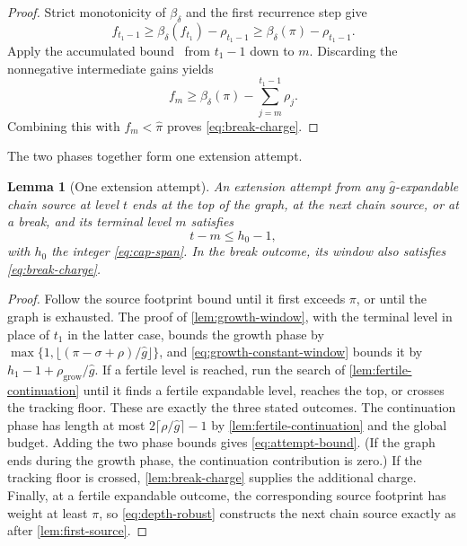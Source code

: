 \documentclass[11pt]{article}
\theoremstyle{plain}
\newtheorem{lemma}{Lemma}
\theoremstyle{remark}
\newcommand{\ghat}{\widehat g}
\newcommand{\pihat}{\widehat{\pi}}
\newcommand{\spend}[2]{\sum_{j=#1}^{#2}\rho_j}
\begin{document}
\begin{proof}
Strict monotonicity of \(\beta_\delta\) and the first recurrence step give
\[
 f_{t_1-1}\ge\beta_\delta(f_{t_1})-\rho_{t_1-1}
 \ge\beta_\delta(\pi)-\rho_{t_1-1}.
\]
Apply the accumulated bound~\cite[Claim 3]{FOCS:Reyzin24} from \(t_1-1\) down to
\(m\).  Discarding the nonnegative intermediate gains yields
\[
 f_m\ge\beta_\delta(\pi)-\spend{m}{t_1-1}.
\]
Combining this with \(f_m<\pihat\) proves \eqref{eq:break-charge}.
\end{proof}

The two phases together form one extension attempt.

\begin{lemma}[One extension attempt]
\label{lem:extension-attempt}
An extension attempt from any \(\ghat\)-expandable chain source at level \(t\) ends
at the top of the graph, at the next chain source, or at a break, and its terminal level
\(m\) satisfies
\begin{equation}
 t-m\le h_0-1,
 \label{eq:attempt-bound}
\end{equation}
with \(h_0\) the integer \eqref{eq:cap-span}.
In the break outcome, its window also satisfies \eqref{eq:break-charge}.
\end{lemma}

\begin{proof}
Follow the source footprint bound until it first exceeds \(\pi\), or until the graph
is exhausted.  The proof of \cref{lem:growth-window}, with the terminal level in
place of \(t_1\) in the latter case, bounds the growth phase by
\(\max\{1,\lfloor(\pi-\sigma+\rho)/\ghat\rfloor\}\), and
\eqref{eq:growth-constant-window} bounds it by
\(h_1-1+\rho_{\mathrm{grow}}/\ghat\).
If a fertile level is reached, run the search of
\cref{lem:fertile-continuation} until it finds a fertile expandable level, reaches
the top, or crosses the tracking floor.  These are exactly the three stated outcomes.
The continuation phase has length at most \(2\lceil\rho/\ghat\rceil-1\)
by \cref{lem:fertile-continuation} and the global budget.  Adding the two phase
bounds gives \eqref{eq:attempt-bound}.  (If the graph ends during the growth phase,
the continuation contribution is zero.)
If the tracking floor is crossed, \cref{lem:break-charge} supplies the additional
charge.  Finally, at a fertile expandable outcome, the corresponding source footprint
has weight at least \(\pi\), so \eqref{eq:depth-robust} constructs the next chain source
exactly as after \cref{lem:first-source}.
\end{proof}
\end{document}
